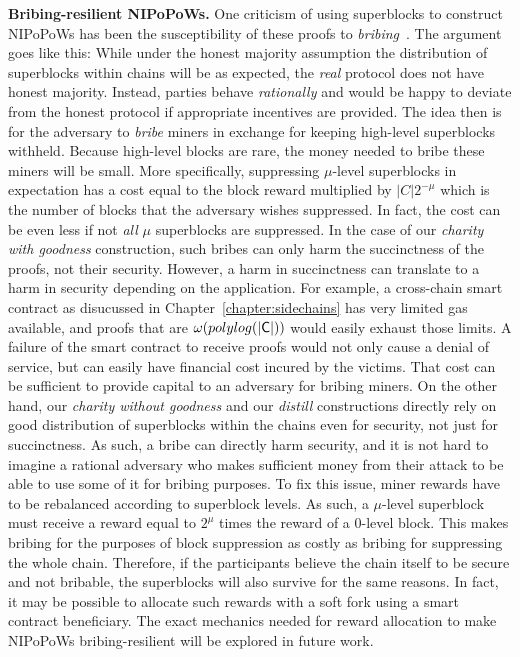 \textbf{Bribing-resilient NIPoPoWs.} One criticism of using superblocks to
construct NIPoPoWs has been the susceptibility of these proofs to
\emph{bribing}~\cite{flyclient}. The argument goes like this: While under the
honest majority assumption the distribution of superblocks within chains will be
as expected, the \emph{real} protocol does not have honest majority. Instead,
parties behave \emph{rationally} and would be happy to deviate from the honest
protocol if appropriate incentives are provided. The idea then is for the
adversary to \emph{bribe} miners in exchange for keeping high-level superblocks
withheld. Because high-level blocks are rare, the money needed to bribe these
miners will be small. More specifically, suppressing $\mu$-level superblocks
in expectation has a cost equal to the block reward multiplied by
$|C|2^{-\mu}$ which is the number of blocks that the adversary wishes
suppressed. In fact, the cost can be even less if not \emph{all} $\mu$
superblocks are suppressed. In the case of our \emph{charity with goodness}
construction, such bribes can only harm the succinctness of the proofs, not
their security. However, a harm in succinctness can translate to a harm in
security depending on the application. For example, a cross-chain smart contract
as disucussed in Chapter~\ref{chapter:sidechains} has very limited gas
available, and proofs that are $\omega(polylog(|\mathsf{C}|))$ would easily exhaust
those limits. A failure of the smart contract to receive proofs would not only
cause a denial of service, but can easily have financial cost incured by the
victims. That cost can be sufficient to provide capital to an adversary for
bribing miners. On the other hand, our \emph{charity without goodness} and our
\emph{distill} constructions directly rely on good distribution of superblocks
within the chains even for security, not just for succinctness. As such, a bribe
can directly harm security, and it is not hard to imagine a rational adversary
who makes sufficient money from their attack to be able to use some of it for
bribing purposes. To fix this issue, miner rewards have to be rebalanced
according to superblock levels. As such, a $\mu$-level superblock must receive
a reward equal to $2^\mu$ times the reward of a $0$-level block. This makes
bribing for the purposes of block suppression as costly as bribing for
suppressing the whole chain. Therefore, if the participants believe the chain
itself to be secure and not bribable, the superblocks will also survive for the
same reasons. In fact, it may be possible to allocate such rewards with a soft
fork using a smart contract beneficiary. The exact mechanics needed for reward
allocation to make NIPoPoWs bribing-resilient will be explored in future work.

